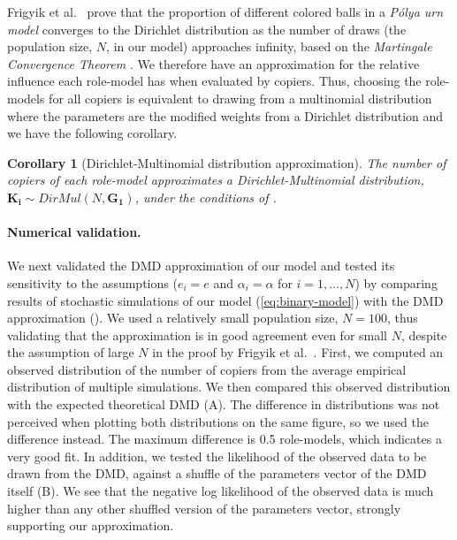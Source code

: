 \documentclass[12pt]{extarticle}
\let\vec\mathbf
\newtheorem{corollary}{Corollary}
\begin{document}
Frigyik et al.~\citep[section 2]{dirichlet} prove that the proportion of different colored balls in a \emph{P\'{o}lya urn model} converges to the Dirichlet distribution as the number of draws  (the population size, $N$, in our model) approaches infinity, based on the \emph{Martingale Convergence Theorem} \citep{martingaleBook}.
We therefore have an approximation for the relative influence each role-model has when evaluated by copiers. Thus, choosing the role-models for all copiers is equivalent to drawing from a {multinomial} distribution where the parameters are the modified weights from a Dirichlet distribution and we have the following corollary.
\\

\begin{corollary}[Dirichlet-Multinomial distribution approximation]\label{cor:dirichlet}
The number of copiers of each role-model approximates a Dirichlet-Multinomial distribution, $\vec{K_i} \sim \textit{DirMul}(N,\vec{G_1})$, under the conditions of .
\end{corollary}

\paragraph{Numerical validation.}
We next validated the DMD approximation of our model
and tested its sensitivity to the assumptions ($e_i=e$ and $\alpha_i=\alpha$ for $i=1,\ldots,N$) by comparing results of stochastic simulations of our model (\cref{eq:binary-model}) with the DMD approximation ().
We used a relatively small population size, $N=100$, thus validating that the approximation is in good agreement even for small $N$, despite the assumption of large $N$ in the proof by Frigyik et al.~\citep[section 2]{dirichlet}.
First, we computed an observed distribution of the number of copiers from the average empirical distribution of multiple simulations.
We then compared this observed distribution with the expected theoretical DMD (A).
The difference in distributions was not perceived when plotting both distributions on the same figure, so we used the difference instead.
The maximum difference is 0.5 role-models, which indicates a very good fit.
In addition, we tested the likelihood of the observed data to be drawn from the DMD, against a shuffle of the parameters vector of the DMD itself (B). We see that the negative log likelihood of the observed data is much higher than any other shuffled version of the parameters vector, strongly supporting our approximation.
\end{document}
